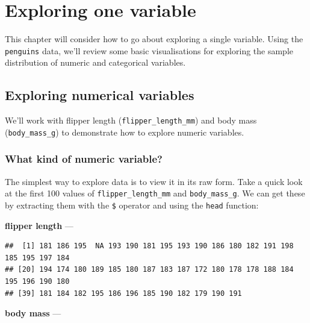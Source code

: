 \documentclass[
]{book}
\newenvironment{Shaded}{\begin{snugshade}}{\end{snugshade}}
\newcommand{\DecValTok}[1]{\textcolor[rgb]{0.00,0.00,0.81}{#1}}
\newcommand{\FunctionTok}[1]{\textcolor[rgb]{0.00,0.00,0.00}{#1}}
\newcommand{\NormalTok}[1]{#1}
\newcommand{\SpecialCharTok}[1]{\textcolor[rgb]{0.00,0.00,0.00}{#1}}
\begin{document}
\hypertarget{exploring-one-variable}{%
\chapter{Exploring one variable}\label{exploring-one-variable}}

This chapter will consider how to go about exploring a single variable. Using the \texttt{penguins} data, we'll review some basic visualisations for exploring the sample distribution of numeric and categorical variables.

\hypertarget{explore-numeric}{%
\section{Exploring numerical variables}\label{explore-numeric}}

We'll work with flipper length (\texttt{flipper\_length\_mm}) and body mass (\texttt{body\_mass\_g}) to demonstrate how to explore numeric variables.

\hypertarget{what-kind-of-numeric-variable}{%
\subsection{What kind of numeric variable?}\label{what-kind-of-numeric-variable}}

The simplest way to explore data is to view it in its raw form. Take a quick look at the first 100 values of \texttt{flipper\_length\_mm} and \texttt{body\_mass\_g}. We can get these by extracting them with the \texttt{\$} operator and using the \texttt{head} function:

\textbf{flipper length} ---

\begin{Shaded}
\end{Shaded}

\begin{verbatim}
##  [1] 181 186 195  NA 193 190 181 195 193 190 186 180 182 191 198 185 195 197 184
## [20] 194 174 180 189 185 180 187 183 187 172 180 178 178 188 184 195 196 190 180
## [39] 181 184 182 195 186 196 185 190 182 179 190 191
\end{verbatim}

\textbf{body mass} ---

\begin{Shaded}
\end{Shaded}
\end{document}

